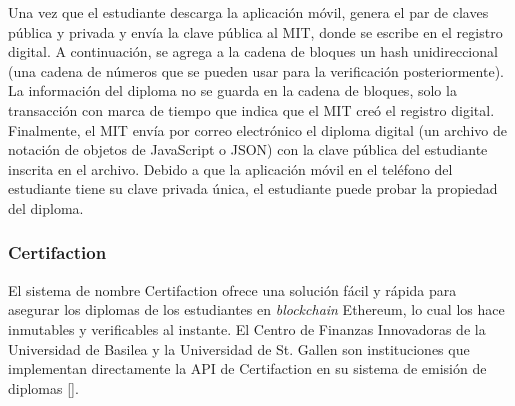 

Una vez que el estudiante descarga la aplicación móvil, genera el par de claves pública y privada y envía la clave pública al MIT, donde se escribe en el registro digital. A continuación, se agrega a la cadena de bloques un hash unidireccional (una cadena de números que se pueden usar para la verificación posteriormente). La información del diploma no se guarda en la cadena de bloques, solo la transacción con marca de tiempo que indica que el MIT creó el registro digital. Finalmente, el MIT envía por correo electrónico el diploma digital (un archivo de notación de objetos de JavaScript o JSON) con la clave pública del estudiante inscrita en el archivo. Debido a que la aplicación móvil en el teléfono del estudiante tiene su clave privada única, el estudiante puede probar la propiedad del diploma.




\subsubsection{Certifaction}
El sistema de nombre Certifaction ofrece una solución fácil y rápida para asegurar los diplomas de los estudiantes en \textit{blockchain} Ethereum, lo cual los hace inmutables y verificables al instante. El Centro de Finanzas Innovadoras de la Universidad de Basilea y la Universidad de St. Gallen son instituciones que implementan directamente la API de Certifaction en su sistema de emisión de diplomas [\cite{82}].


